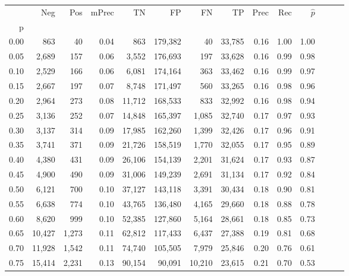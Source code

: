 \begin{tabular}{rrrrrrrrrrrrrr}
\toprule
{} &     Neg &    Pos & mPrec &       TN &       FP &      FN &      TP &  Prec &   Rec & $\hat{p}$ \\
p    &         &        &       &          &          &         &         &       &       &           \\
\midrule
0.00 &     863 &     40 &  0.04 &      863 &  179,382 &      40 &  33,785 &  0.16 &  1.00 &      1.00 \\
0.05 &   2,689 &    157 &  0.06 &    3,552 &  176,693 &     197 &  33,628 &  0.16 &  0.99 &      0.98 \\
0.10 &   2,529 &    166 &  0.06 &    6,081 &  174,164 &     363 &  33,462 &  0.16 &  0.99 &      0.97 \\
0.15 &   2,667 &    197 &  0.07 &    8,748 &  171,497 &     560 &  33,265 &  0.16 &  0.98 &      0.96 \\
0.20 &   2,964 &    273 &  0.08 &   11,712 &  168,533 &     833 &  32,992 &  0.16 &  0.98 &      0.94 \\
0.25 &   3,136 &    252 &  0.07 &   14,848 &  165,397 &   1,085 &  32,740 &  0.17 &  0.97 &      0.93 \\
0.30 &   3,137 &    314 &  0.09 &   17,985 &  162,260 &   1,399 &  32,426 &  0.17 &  0.96 &      0.91 \\
0.35 &   3,741 &    371 &  0.09 &   21,726 &  158,519 &   1,770 &  32,055 &  0.17 &  0.95 &      0.89 \\
0.40 &   4,380 &    431 &  0.09 &   26,106 &  154,139 &   2,201 &  31,624 &  0.17 &  0.93 &      0.87 \\
0.45 &   4,900 &    490 &  0.09 &   31,006 &  149,239 &   2,691 &  31,134 &  0.17 &  0.92 &      0.84 \\
0.50 &   6,121 &    700 &  0.10 &   37,127 &  143,118 &   3,391 &  30,434 &  0.18 &  0.90 &      0.81 \\
0.55 &   6,638 &    774 &  0.10 &   43,765 &  136,480 &   4,165 &  29,660 &  0.18 &  0.88 &      0.78 \\
0.60 &   8,620 &    999 &  0.10 &   52,385 &  127,860 &   5,164 &  28,661 &  0.18 &  0.85 &      0.73 \\
0.65 &  10,427 &  1,273 &  0.11 &   62,812 &  117,433 &   6,437 &  27,388 &  0.19 &  0.81 &      0.68 \\
0.70 &  11,928 &  1,542 &  0.11 &   74,740 &  105,505 &   7,979 &  25,846 &  0.20 &  0.76 &      0.61 \\
0.75 &  15,414 &  2,231 &  0.13 &   90,154 &   90,091 &  10,210 &  23,615 &  0.21 &  0.70 &      0.53 \\

\end{tabular}
